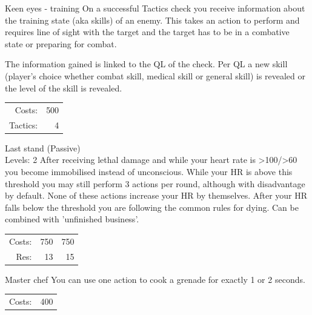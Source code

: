 \begin{skill}{Keen eyes - training}
	\setlength{\parskip}{8pt}
	\setlength{\parindent}{0pt}
	On a successful Tactics check you receive information about the training state (aka skills) of an enemy. This takes an action to perform and requires line of sight with the target and the target has to be in a combative state or preparing for combat. 

	The information gained is linked to the QL of the check. Per QL a new skill (player’s choice whether combat skill, medical skill or general skill) is revealed or the level of the skill is revealed.\\

	\hfill
	\begin{tabular}{rr}
		Costs: & 500 \\
		Tactics: & 4 \\
	\end{tabular}
\end{skill}

\begin{skill}{Last stand (Passive) \\\phantom{a}\hfill Levels: 2}
	\setlength{\parskip}{8pt}
	\setlength{\parindent}{0pt}
	After receiving lethal damage and while your heart rate is >100/>60 you become immobilised instead of unconscious. While your HR is above this threshold you may still perform 3 actions per round, although with disadvantage by default. None of these actions increase your HR by themselves. After your HR falls below the threshold you are following the common rules for dying. Can be combined with 'unfinished business'.\\

	\hfill
	\begin{tabular}{rrr}
		Costs: & 750 & 750 \\
		Res: & 13 & 15 \\
	\end{tabular}
\end{skill}

\begin{skill}{Master chef}
	\setlength{\parskip}{8pt}
	\setlength{\parindent}{0pt}
	You can use one action to cook a grenade for exactly 1 or 2 seconds.\\

	\hfill
	\begin{tabular}{rr}
		Costs: & 400 \\
	\end{tabular}
\end{skill}


